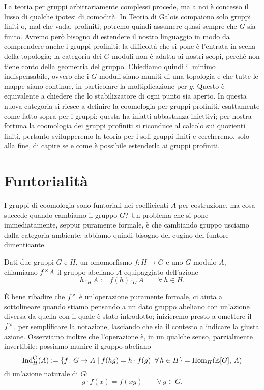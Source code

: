 \begin{profinite}
	La teoria per gruppi arbitrariamente complessi procede, ma a noi è concesso il lusso di qualche ipotesi di comodità. In Teoria di Galois compaiono solo gruppi finiti o, mal che vada, profiniti; potremo quindi assumere quasi sempre che $ G $ sia finito. Avremo però bisogno di estendere il nostro linguaggio in modo da comprendere anche i gruppi profiniti: la difficoltà che si pone è l'entrata in scena della topologia; la categoria dei $ G $-moduli non è adatta ai nostri scopi, perché non tiene conto della geometria del gruppo. Chiediamo quindi il minimo indispensabile, ovvero che i $ G $-moduli siano muniti di una topologia e che tutte le mappe siano continue, in particolare la moltiplicazione per $ g $. Questo è equivalente a chiedere che lo stabilizzatore di ogni punto sia aperto. In questa nuova categoria si riesce a definire la coomologia per gruppi profiniti, esattamente come fatto sopra per i gruppi: questa ha infatti abbastanza iniettivi; per nostra fortuna la coomologia dei gruppi profiniti si riconduce al calcolo sui quozienti finiti, pertanto svilupperemo la teoria per i soli gruppi finiti e cercheremo, solo alla fine, di capire se e come è possibile estenderla ai gruppi profiniti.
\end{profinite}

\section{Funtorialità}
I gruppi di coomologia sono funtoriali nei coefficienti $ A $ per costruzione, ma cosa succede quando cambiamo il gruppo $ G $? Un problema che si pone immediatamente, seppur puramente formale, è che cambiando gruppo usciamo dalla categoria ambiente: abbiamo quindi bisogno del cugino del funtore dimenticante.

\begin{definition}
	Dati due gruppi $ G $ e $ H $, un omomorfismo $ f \colon H \to G $ e uno $ G $-modulo $ A $, chiamiamo $ f^\times A $ il gruppo abeliano $ A $ equipaggiato dell'azione
	\[ h \cdot_{H} A := f(h) \cdot_{G} A \qquad \forall\, h \in H. \]
\end{definition}

È bene ribadire che $ f^\times $ è un'operazione puramente formale, ci aiuta a sottolineare quando stiamo pensando a un dato gruppo abeliano con un'azione diversa da quella con il quale è stato introdotto; inizieremo presto a omettere il $ f^\times $, per semplificare la notazione, lasciando che sia il contesto a indicare la giusta azione. Osserviamo inoltre che l'operazione è, in un qualche senso, parzialmente invertibile: possiamo munire il gruppo abeliano
\[ \operatorname{Ind}_{H}^G(A) := \{ f \colon G \to A \mid f(hg) = h \cdot f(g) \;\; \forall\, h \in H \} = \operatorname{Hom}_{H}(\mathbb{Z}[G], \, A) \]
di un'azione naturale di $ G $:
\[g \cdot f(x) = f(xg) \qquad\forall\, g \in G. \]


